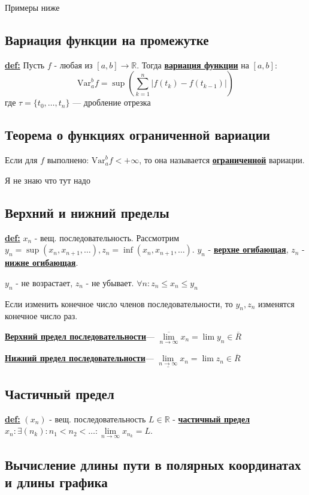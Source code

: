 \documentclass{article}
\newcommand{\Var}{\text{Var}}
\newcommand{\deff}[1]{\underline{\textbf{#1}}}
\begin{document}
Примеры ниже

\subsection{Вариация функции на промежутке}

\deff{def:} Пусть $f$ - любая из $[a,b] \rightarrow \mathbb{R}$. Тогда \deff{вариация функции} на $[a,b]$: 
$$\Var_a^b f = \sup (\sum\limits_{k=1}^n |f(t_k)-f(t_{k-1})|)$$
где $\tau = \{t_0,\ldots, t_n\}$ --- дробление отрезка

\subsection{Теорема о функциях ограниченной вариации}

Если для $f$ выполнено: $\Var_a^b f < + \infty$, то она называется \deff{ограниченной} вариации.

Я не знаю что тут надо

\subsection{Верхний и нижний пределы}


\deff{def:} $x_n$ - вещ. последовательность. Рассмотрим $y_n = \sup (x_n, x_{n+1},\ldots),z_n = \inf(x_n,x_{n+1},\ldots)$. $y_n$ - \deff{верхне огибающая}, $z_n$ - \deff{нижне огибающая}. 

$y_n$ - не возрастает, $z_n$ - не убывает. $\forall n: z_n\leq x_n \leq y_n$

Если изменить конечное число членов последовательности, то $y_n,z_n$ изменятся конечное число раз.

\deff{Верхний предел последовательности}--- $\overline{\lim\limits_{n\rightarrow \infty}}x_n=\lim y_n \in \overline{R}$

\deff{Нижний предел последовательности}--- $\underline{\lim\limits_{n\rightarrow \infty}}x_n=\lim z_n \in \overline{R}$


\subsection{Частичный предел}

\deff{def:} $(x_n)$ - вещ. последовательность $L\in \mathbb{R}$ - \deff{частичный предел} $x_n: \exists (n_k):n_1<n_2<\ldots: \lim\limits_{n\rightarrow \infty} x_{n_k}=L$.

\subsection{Вычисление длины пути в полярных координатах и длины графика}
\end{document}
